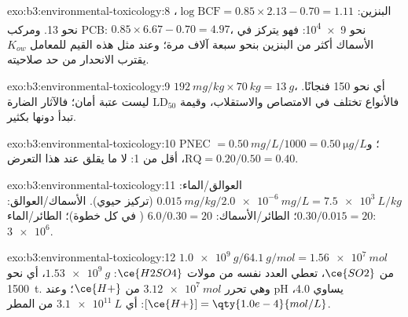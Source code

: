 \begin{solution}{exo:b3:environmental-toxicology:8}
البنزين: $\log\mathrm{BCF} = 0.85 \times 2.13 - 0.70 = 1.11$،  نحو 13. ومركب PCB: $0.85 \times 6.67 - 0.70 = 4.97$،  نحو
\num{9e4}: فهو يتركز في الأسماك أكثر من البنزين بنحو سبعة آلاف مرة؛ وعند مثل هذه القيم للمعامل
$K_{ow}$ يقترب الانحدار من حد صلاحيته.
\end{solution}

\begin{solution}{exo:b3:environmental-toxicology:9}
$\qty{192}{mg/kg} \times \qty{70}{kg} = \qty{13}{g}$، أي نحو 150 فنجانًا. فالأنواع تختلف في الامتصاص والاستقلاب،
وقيمة $\mathrm{LD_{50}}$ ليست عتبة أمان؛ فالآثار الضارة تبدأ دونها بكثير.
\end{solution}

\begin{solution}{exo:b3:environmental-toxicology:10}
PNEC $= \qty{0.50}{mg/L}/1000 = \qty{0.50}{\micro g/L}$؛ و$\mathrm{RQ} = 0.20/0.50 = 0.40$، أقل من 1: لا ما يقلق عند هذا التعرض.
\end{solution}

\begin{solution}{exo:b3:environmental-toxicology:11}
العوالق/الماء: $\qty{0.015}{mg/kg}/\qty{2.0e-6}{mg/L} = \qty{7.5e3}{L/kg}$ (تركيز حيوي). الأسماك/العوالق: $0.30/0.015 = 20$؛
الطائر/الأسماك: $6.0/0.30 = 20$ ( في كل خطوة)؛ الطائر/الماء: $\num{3e6}$.
\end{solution}

\begin{solution}{exo:b3:environmental-toxicology:12}
$\qty{1.0e9}{g}/\qty{64.1}{g/mol} = \qty{1.56e7}{mol}$ من $\ce{SO2}$، تعطي العدد نفسه من مولات $\ce{H2SO4}$: $\qty{1.53e9}{g}$، أي نحو \qty{1500}{t}. وهي
تحرر $\qty{3.12e7}{mol}$ من $\ce{H+}$؛ وعند pH يساوي 4.0، $[\ce{H+}] = \qty{1.0e-4}{mol/L}$: أي $\qty{3.1e11}{L}$ من المطر.
\end{solution}

